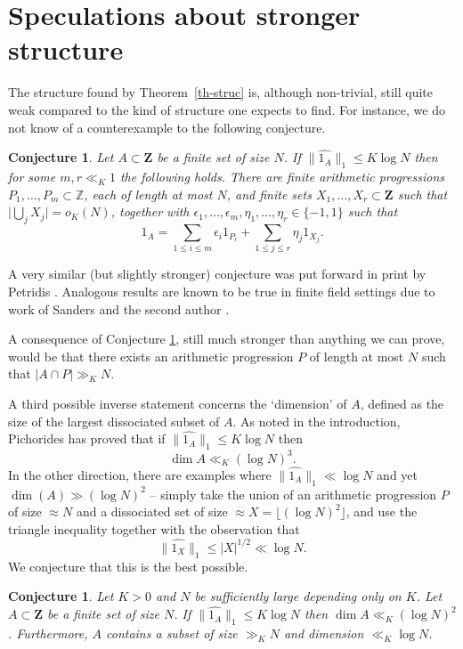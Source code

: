 \documentclass[reqno]{amsart}
\newcommand{\anorm}[1]{\| \widehat{#1}\|}
\renewcommand{\leq}{\leqslant}
\newcommand{\bbz}{\mathbf{Z}}
\newcommand{\abs}[1]{\left\lvert #1\right\rvert}
\numberwithin{equation}{section}
\newtheorem{conjecture}[theorem]{Conjecture}
\theoremstyle{definition}
\theoremstyle{remark}
\begin{document}
\section{Speculations about stronger structure}\label{sec-conj}
The structure found by Theorem~\ref{th-struc} is, although non-trivial, still quite weak compared to the kind of structure one expects to find. For instance, we do not know of a counterexample to the following conjecture.
\begin{conjecture}\label{conj-1}
Let $A\subset \bbz$ be a finite set of size $N$. If $\anorm{1_A}_1\leq K\log N$ then for some $m,r\ll_K 1$ the following holds. There are finite arithmetic progressions $P_1,\ldots,P_m\subset \mathbb{Z}$, each of length at most $N$, and finite sets $X_1,\ldots,X_r\subset \bbz$ such that $\big| \bigcup_{j}X_j\big|=o_K(N)$,
together with $\epsilon_1,\ldots,\epsilon_m,\eta_1,\ldots,\eta_r\in \{-1,1\}$ such that
\[1_A=\sum_{1\leq i\leq m}\epsilon_i 1_{P_i}+\sum_{1\leq j\leq r}\eta_j 1_{X_j}.\]
\end{conjecture}
A very similar (but slightly stronger) conjecture was put forward in print by Petridis \cite[Question 5.1]{Pe13}. Analogous results are known to be true in finite field settings due to work of Sanders and the second author \cite{GrSa08}.

A consequence of Conjecture \ref{conj-1}, still much stronger than anything we can prove, would be that there exists an arithmetic progression $P$ of length at most $N$ such that $|A \cap P| \gg_K N$. 

A third possible inverse statement concerns the `dimension' of $A$, defined as the size of the largest dissociated subset of $A$. As noted in the introduction, Pichorides \cite{Pi80} has proved that if $\anorm{1_A}_1\leq K\log N$ then
\[\dim A \ll_K (\log N)^3.\]
In the other direction, there are examples where $\anorm{1_A}_1\ll \log N$ and yet $\dim(A) \gg (\log N)^2$ -- simply take the union of an arithmetic progression $P$ of size $\approx N$ and a dissociated set of size $\approx X = \lfloor (\log N)^2 \rfloor$, and use the triangle inequality together with the observation that
\[\anorm{1_X}_1\leq \abs{X}^{1/2}\ll \log N.\]
We conjecture that this is the best possible.
\begin{conjecture}
Let $K>0$ and $N$ be sufficiently large depending only on $K$. Let $A\subset \bbz$ be a finite set of size $N$. If $\anorm{1_A}_1\leq K\log N$ then $\dim A\ll_K (\log N)^2$. Furthermore, $A$ contains a subset of size $\gg_K N$ and dimension $\ll_K \log N$.
\end{conjecture}



 
\end{document}
